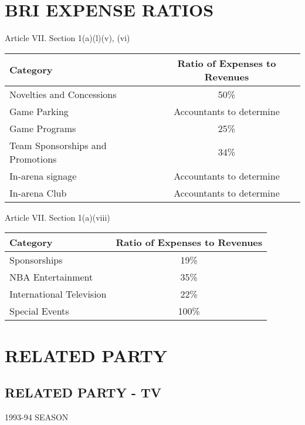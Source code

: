 \documentclass[
]{book}
\begin{document}
\hypertarget{bri-expense-ratios}{%
\chapter{BRI EXPENSE RATIOS}\label{bri-expense-ratios}}

Article VII. Section 1(a)(l)(v), (vi)

\begin{longtable}[]{@{}lc@{}}
\toprule()
Category & Ratio of Expenses to Revenues \\
\midrule()
\endhead
Novelties and Concessions & 50\% \\
Game Parking & Accountants to determine \\
Game Programs & 25\% \\
Team Sponsorships and Promotions & 34\% \\
In-arena signage & Accountants to determine \\
In-arena Club & Accountants to determine \\
\bottomrule()
\end{longtable}

Article VII. Section 1(a)(viii)

\begin{longtable}[]{@{}lc@{}}
\toprule()
Category & Ratio of Expenses to Revenues \\
\midrule()
\endhead
Sponsorships & 19\% \\
NBA Entertainment & 35\% \\
International Television & 22\% \\
Special Events & 100\% \\
\bottomrule()
\end{longtable}

\hypertarget{related-party}{%
\chapter{RELATED PARTY}\label{related-party}}

\hypertarget{related-party---tv}{%
\section{RELATED PARTY - TV}\label{related-party---tv}}

1993-94 SEASON
\end{document}
